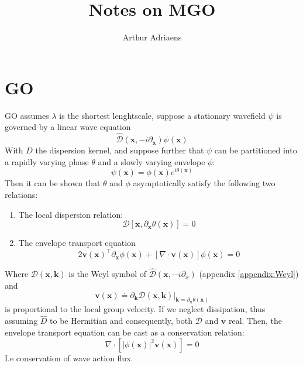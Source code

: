 \documentclass{article}
\title{Notes on MGO}
\author{Arthur Adriaens}
\begin{document}
\maketitle

\section{GO}
GO assumes $\lambda$ is the shortest lenghtscale, suppose a stationary wavefield $\psi$ is governed by a linear wave equation
\begin{equation}
    \hat{\mathcal{D}}(\mathbf{x},-i\partial_\mathbf{x})\psi(\mathbf{x})
    \label{eq:BasicGO}
\end{equation}
With $D$ the dispersion kernel, and suppose further that $\psi$
can be partitioned into a rapidly varying phase $\theta$ and a
slowly varying envelope $\phi$:
\begin{equation}
    \psi(\mathbf{x}) = \phi(\mathbf{x})e^{i\theta(\mathbf{x})}
\end{equation}
Then it can be shown that $\theta$ and $\phi$ asymptotically
satisfy the following two relations:

\begin{enumerate}
    \item The local dispersion relation:
\begin{equation}
    \mathcal{D} [\mathbf{x},\partial_\mathbf{x} \theta(\mathbf{x})] = 0
\end{equation}
    \item The envelope transport equation
\begin{equation}
    2\mathbf{v}(\mathbf{x})^\intercal \partial_\mathbf{x}\phi(\mathbf{x}) + [\nabla\cdot\mathbf{v}(\mathbf{x})]\phi(\mathbf{x}) = 0
\end{equation}
\end{enumerate}

\noindent
Where $\mathcal{D}(\mathbf{x},\mathbf{k})$ is the Weyl symbol of
$\hat{\mathcal{D}}(\mathbf{x},-i\partial_x)$ (appendix \ref{appendix:Weyl}) and 
\begin{equation}
    \mathbf{v}(\mathbf{x}) \stackrel{.}{=} \partial_\mathbf{k}\mathcal{D}(\mathbf{x},\mathbf{k})|_{\mathbf{k}=\partial_\mathbf{x}\theta(\mathbf{x})}
\end{equation}
is proportional to the local group velocity.
If we neglect dissipation, thus assuming
$\hat{D}$ to be Hermitian and consequently, both 
$\mathcal{D}$ and $\mathbf{v}$ real. Then, the envelope transport equation can be cast as a conservation relation:
\begin{equation}
    \nabla\cdot[|\phi(\mathbf{x})|^2\mathbf{v}(\mathbf{x})] = 0
\end{equation}
I.e conservation of wave action flux.
\end{document}
